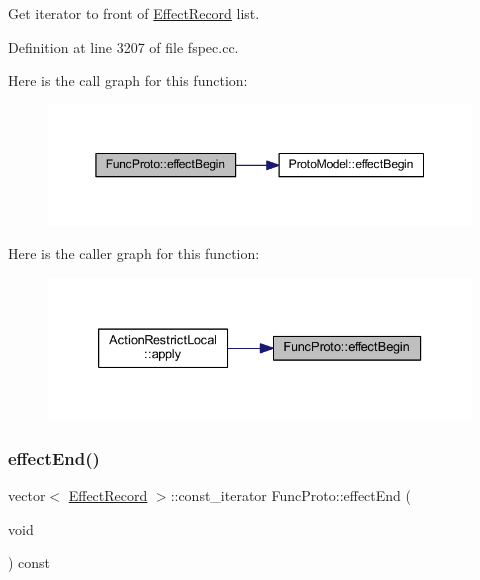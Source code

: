 Get iterator to front of \mbox{\hyperlink{class_effect_record}{Effect\+Record}} list. 



Definition at line 3207 of file fspec.\+cc.

Here is the call graph for this function\+:
\nopagebreak
\begin{figure}[H]
\begin{center}
\leavevmode
\includegraphics[width=350pt]{class_func_proto_a802de184a6ac675b8f4bb4c4cb47a194_cgraph}
\end{center}
\end{figure}
Here is the caller graph for this function\+:
\nopagebreak
\begin{figure}[H]
\begin{center}
\leavevmode
\includegraphics[width=333pt]{class_func_proto_a802de184a6ac675b8f4bb4c4cb47a194_icgraph}
\end{center}
\end{figure}
\mbox{\label{class_func_proto_a75adeed5dd962662f85c69b6104a8d07}} 
\subsubsection{\texorpdfstring{effectEnd()}{effectEnd()}}
{\footnotesize\ttfamily vector$<$ \mbox{\hyperlink{class_effect_record}{Effect\+Record}} $>$\+::const\+\_\+iterator Func\+Proto\+::effect\+End (\begin{DoxyParamCaption}\item[{void}]{ }\end{DoxyParamCaption}) const}



